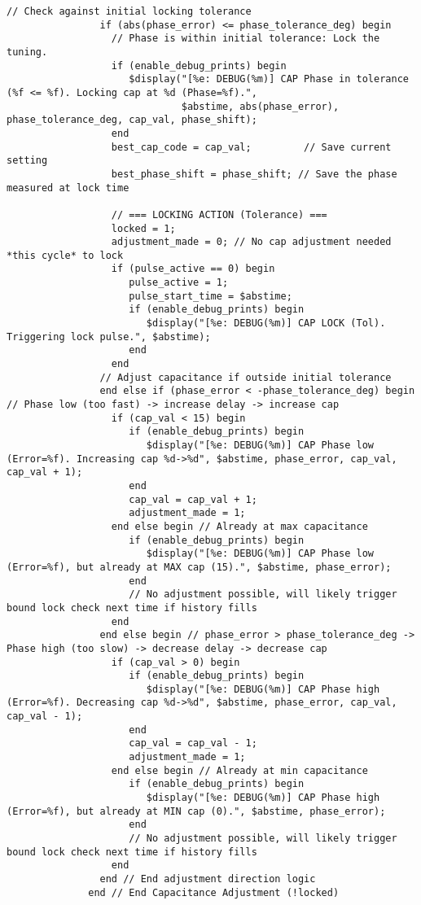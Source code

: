\begin{lstlisting}[caption={Verilog-A Generic Capacitor Tuner Implementation}]
                // Check against initial locking tolerance
                if (abs(phase_error) <= phase_tolerance_deg) begin
                  // Phase is within initial tolerance: Lock the tuning.
                  if (enable_debug_prints) begin
                     $display("[%e: DEBUG(%m)] CAP Phase in tolerance (%f <= %f). Locking cap at %d (Phase=%f).",
                              $abstime, abs(phase_error), phase_tolerance_deg, cap_val, phase_shift);
                  end
                  best_cap_code = cap_val;         // Save current setting
                  best_phase_shift = phase_shift; // Save the phase measured at lock time

                  // === LOCKING ACTION (Tolerance) ===
                  locked = 1;
                  adjustment_made = 0; // No cap adjustment needed *this cycle* to lock
                  if (pulse_active == 0) begin
                     pulse_active = 1;
                     pulse_start_time = $abstime;
                     if (enable_debug_prints) begin
                        $display("[%e: DEBUG(%m)] CAP LOCK (Tol). Triggering lock pulse.", $abstime);
                     end
                  end
                // Adjust capacitance if outside initial tolerance
                end else if (phase_error < -phase_tolerance_deg) begin // Phase low (too fast) -> increase delay -> increase cap
                  if (cap_val < 15) begin
                     if (enable_debug_prints) begin
                        $display("[%e: DEBUG(%m)] CAP Phase low (Error=%f). Increasing cap %d->%d", $abstime, phase_error, cap_val, cap_val + 1);
                     end
                     cap_val = cap_val + 1;
                     adjustment_made = 1;
                  end else begin // Already at max capacitance
                     if (enable_debug_prints) begin
                        $display("[%e: DEBUG(%m)] CAP Phase low (Error=%f), but already at MAX cap (15).", $abstime, phase_error);
                     end
                     // No adjustment possible, will likely trigger bound lock check next time if history fills
                  end
                end else begin // phase_error > phase_tolerance_deg -> Phase high (too slow) -> decrease delay -> decrease cap
                  if (cap_val > 0) begin
                     if (enable_debug_prints) begin
                        $display("[%e: DEBUG(%m)] CAP Phase high (Error=%f). Decreasing cap %d->%d", $abstime, phase_error, cap_val, cap_val - 1);
                     end
                     cap_val = cap_val - 1;
                     adjustment_made = 1;
                  end else begin // Already at min capacitance
                     if (enable_debug_prints) begin
                        $display("[%e: DEBUG(%m)] CAP Phase high (Error=%f), but already at MIN cap (0).", $abstime, phase_error);
                     end
                     // No adjustment possible, will likely trigger bound lock check next time if history fills
                  end
                end // End adjustment direction logic
              end // End Capacitance Adjustment (!locked)


\end{lstlisting}
